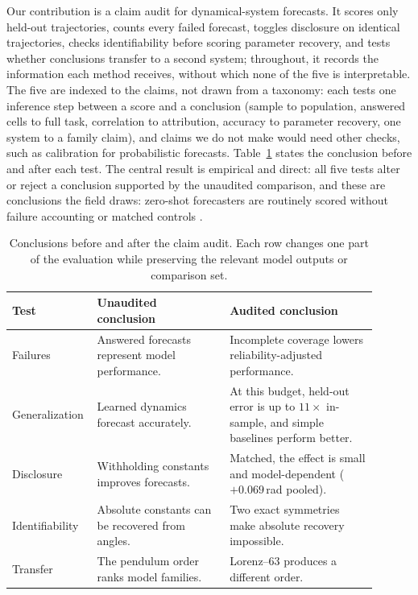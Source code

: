 \documentclass{article}
\begin{document}
Our contribution is a claim audit for dynamical-system forecasts. It scores only held-out
trajectories, counts every failed forecast, toggles disclosure on identical trajectories,
checks identifiability before scoring parameter recovery, and tests whether conclusions transfer
to a second system; throughout, it records the information each method receives, without which
none of the five is interpretable. The five are indexed to the claims, not drawn from a
taxonomy: each tests one inference step between a score and a conclusion (sample to population,
answered cells to full task, correlation to attribution, accuracy to parameter recovery, one
system to a family claim), and claims we do not make would need other checks, such as
calibration for probabilistic forecasts.
Table~\ref{tab:audit-summary} states the conclusion before and after each test. The central
result is empirical and direct: all five tests alter or reject a conclusion supported by the
unaudited comparison, and these are conclusions the field draws: zero-shot forecasters are
routinely scored without failure accounting or matched controls
\citep{gruver2023llmtime,zhang2025zeroshotchaos}.

\begin{table}[tbp]
\centering\footnotesize\renewcommand{\arraystretch}{0.78}
\caption{Conclusions before and after the claim audit. Each row changes one part of the
evaluation while preserving the relevant model outputs or comparison set.}
\label{tab:audit-summary}
\begin{tabular}{p{0.16\linewidth}p{0.35\linewidth}p{0.39\linewidth}}
\toprule
Test & Unaudited conclusion & Audited conclusion \\
\midrule
Failures &
Answered forecasts represent model performance. &
Incomplete coverage lowers reliability-adjusted performance. \\
Generalization &
Learned dynamics forecast accurately. &
At this budget, held-out error is up to $11\times$ in-sample, and simple baselines perform better. \\
Disclosure &
Withholding constants improves forecasts. &
Matched, the effect is small and model-dependent ($+0.069$\,rad pooled). \\
Identifiability &
Absolute constants can be recovered from angles. &
Two exact symmetries make absolute recovery impossible. \\
Transfer &
The pendulum order ranks model families. &
Lorenz--63 produces a different order. \\
\bottomrule
\end{tabular}
\end{table}
\end{document}
